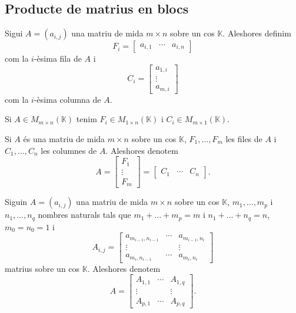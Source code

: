 \documentclass[../Apunts.tex]{subfiles}
\begin{document}
	\subsection{Producte de matrius en blocs}%
	\begin{definition}
		\label{def:fila d'una matriu}
		\label{def:columna d'una matriu}
		Sigui \(A=(a_{i,j})\) una matriu de mida \(m\times n\) sobre un cos \(\mathbb{K}\). Aleshores definim
		\[F_{i}=\left[\begin{matrix}
		a_{i,1} & \cdots & a_{i,n}
		\end{matrix}\right]\]
		com la \(i\)-èsima fila de \(A\) i
		\[C_{i}=\left[\begin{matrix}
		a_{1,i} \\
		\vdots \\
		a_{m,i}
		\end{matrix}\right]\]
		com la \(i\)-èsima columna de \(A\).
	\end{definition}
	\begin{observation}
		\label{obs:on pertanyen les files i les columnes d'una matriu}
		Si \(A\in M_{m\times n}(\mathbb{K})\) tenim \(F_{i}\in M_{1\times n}(\mathbb{K})\) i \(C_{i}\in M_{m\times 1}(\mathbb{K})\).
	\end{observation}
	\begin{notation}
		Si \(A\) és una matriu de mida \(m\times n\) sobre un cos \(\mathbb{K}\), \(F_{1},\dots,F_{m}\) les files de \(A\) i \(C_{1},\dots,C_{n}\) les columnes de \(A\). Aleshores denotem
		\[A=\left[\begin{matrix}
		F_{1} \\
		\vdots \\
		F_{m}
		\end{matrix}\right]=\left[\begin{matrix}
		C_{1} & \cdots & C_{n}
		\end{matrix}\right].\]
	\end{notation}
	\begin{notation}
		Siguin \(A=(a_{i,j})\) una matriu de mida \(m\times n\) sobre un cos \(\mathbb{K}\), \(m_{1},\dots,m_{p}\) i \(n_{1},\dots,n_{q}\) nombres naturals tals que \(m_{1}+\dots+m_{p}=m\) i \(n_{1}+\dots+n_{q}=n\), \(m_{0}=n_{0}=1\) i
		\[A_{i,j}=\left[\begin{matrix}
		a_{m_{i-1},n_{i-1}} & \cdots & a_{m_{i-1},n_{i}}\\
		\vdots & & \vdots \\
		a_{m_{i},n_{i-1}} & \cdots & a_{m_{i},n_{i}}
		\end{matrix}\right]\]
		matrius sobre un cos \(\mathbb{K}\). Aleshores denotem
		\[A=\left[\begin{matrix}
		A_{1,1} & \cdots & A_{1,q} \\
		\vdots & & \vdots \\
		A_{p,1} & \cdots & A_{p,q}
		\end{matrix}\right].\]
	\end{notation}
\end{document}
